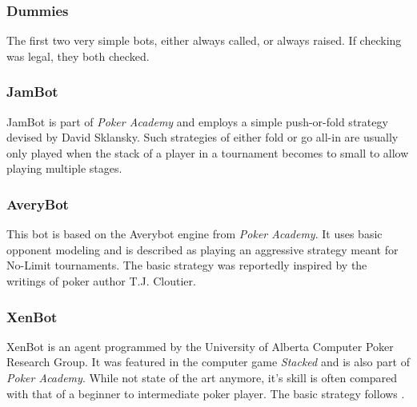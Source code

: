 \subsubsection{Dummies}
The first two very simple bots, either always called, or always raised. If checking was legal, they both checked.

\subsubsection{JamBot}
JamBot is part of  \textit{Poker Academy} and employs a simple push-or-fold strategy devised by David Sklansky. Such strategies of either fold or go all-in are usually only played when the stack of a player in a tournament becomes to small to allow playing multiple stages. 
\subsubsection{AveryBot}
This bot is based on the Averybot engine from \textit{Poker Academy}. It uses basic opponent modeling and is described as playing an aggressive strategy meant for No-Limit tournaments. The basic strategy was reportedly inspired by the writings of poker author T.J. Cloutier.


\subsubsection{XenBot}
XenBot is an agent programmed by the University of Alberta Computer Poker Research Group. It was featured in the computer game \textit{Stacked} and is also part of \textit{Poker Academy}. While not state of the art anymore, it's skill is often compared with that of a beginner to intermediate poker player. The basic strategy follows \cite{Billings1995}.
 

